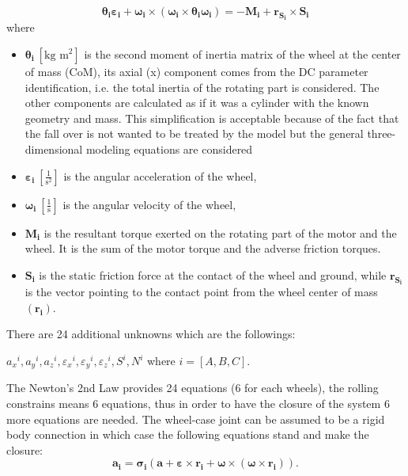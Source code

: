 \documentclass[12pt,english,twoside]{article}
\begin{document}
\begin{equation}
\boldsymbol{\theta_i} \boldsymbol{\varepsilon_i} +\boldsymbol{\omega_i} \times (\boldsymbol{\omega_i} \times \boldsymbol{\theta_i \boldsymbol{\omega_i}}) = - \mathbf{M_i} + \mathbf{r_{S_i}} \times \mathbf{S_i}
\end{equation}
where \begin{itemize}
	\item $\boldsymbol{\theta_i}~[\text{kg m}^2]$ is the second moment of inertia matrix of the wheel at the center of mass (CoM), its axial (x) component comes from the DC parameter identification, i.e. the total inertia of the rotating part is considered.
	The other components are calculated as if it was a cylinder with the known geometry and mass. This simplification is acceptable because of the fact that the fall over is not wanted to be treated by the model but the general three-dimensional modeling equations are considered
	\item $\boldsymbol{\varepsilon_i}~[\frac{1}{\text{s}^2}]$ is the angular acceleration of the wheel,
	\item $\boldsymbol{\omega_i}~[\frac{1}{\text{s}}]$ is the angular velocity of the wheel,
	\item $\mathbf{M_i}$ is the resultant torque exerted on the rotating part of the motor and the wheel. It is the sum of the motor torque and the adverse friction torques.
	\item $\mathbf{S_i}$ is the static friction force at the contact of the wheel and ground, while $\mathbf{r_{S_i}}$ is the vector pointing to the contact point from the wheel center of mass $(\mathbf{r_{i}})$.
\end{itemize}
There are 24 additional unknowns which are the followings:
\begin{center}
	${a_x}^i,{a_y}^i,{a_z}^i,{\varepsilon_x}^i,{\varepsilon_y}^i,{\varepsilon_z}^i,S^i,N^i$ where $i=[A,B,C]$.
\end{center}
The Newton's 2nd Law provides 24 equations (6 for each wheels), the rolling constrains means 6 equations, thus in order to have the closure of the system 6 more equations are needed.
The wheel-case joint can be assumed to be a rigid body connection in which case the following equations stand and make the closure:
\begin{equation}
	\mathbf{a_i} = \boldsymbol{\sigma_i} (\mathbf{a}+\boldsymbol{\varepsilon} \times \mathbf{r_i}+\boldsymbol{\omega} \times (\boldsymbol{\omega} \times \mathbf{r_i})).
\end{equation}
\end{document}
